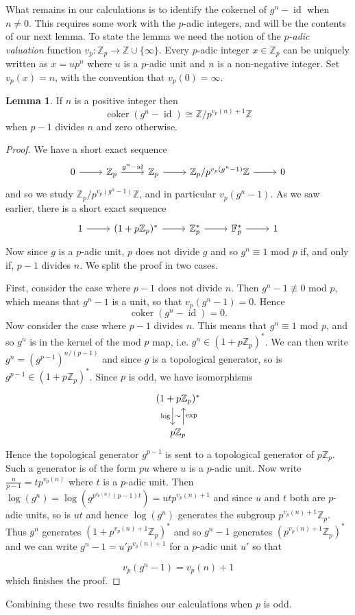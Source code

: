 \documentclass[a4paper]{article} %
\theoremstyle{definition}
\newtheorem{lemma}[theorem]{Lemma}
\newcommand{\Z}{\mathbb{Z}}
\newcommand{\F}{\mathbb{F}}
\DeclareMathOperator{\id}{id}           %
\DeclareMathOperator{\coker}{coker}     %
\begin{document}
What remains in our calculations is to identify the cokernel of $g^n-\id$ when $n \neq 0$. This requires some work with the $p$-adic integers, and will be the contents of our next lemma. To state the lemma we need the notion of the \textit{$p$-adic valuation} function $v_p \colon \Z_p \to \Z \cup \{\infty\}$. Every $p$-adic integer $x \in \Z_p$ can be uniquely written as $x = up^n$ where $u$ is a $p$-adic unit and $n$ is a non-negative integer. Set $v_p(x) = n$, with the convention that $v_p(0) = \infty$.
\begin{lemma}
  If $n$ is a positive integer then
  \[
    \coker(g^n - \id) \cong \Z/p^{v_p(n)+1}\Z
  \]
  when $p-1$ divides $n$ and zero otherwise.
\end{lemma}
\begin{proof}
We have a short exact sequence
\[
\begin{tikzcd}
0 \rar & \Z_p \rar{g^n - \operatorname{id}} & \Z_p \rar{} & \Z_p/{p^{v_p(g^n-1)}\Z} \rar & 0
\end{tikzcd}
\]
and so we study $\Z_p/{p^{v_p(g^n-1)}\Z}$, and in particular $v_p(g^n-1)$. As we saw earlier, there is a short exact sequence
\[
\begin{tikzcd}
1 \rar & (1+p\Z_p)^* \rar{} & \Z_p^* \rar{} & \F_p^* \rar & 1
\end{tikzcd}
\]
Now since $g$ is a $p$-adic unit, $p$ does not divide $g$ and so $g^n \equiv 1$ mod $p$ if, and only if, $p-1$ divides $n$. We split the proof in two cases.

First, consider the case where $p-1$ does not divide $n$. Then $g^n -1 \not\equiv 0$ mod $p$, which means that $g^n -1$ is a unit, so that $v_p(g^n - 1) = 0$. Hence
\[
\coker ( g^n - \id ) = 0.
\]
Now consider the case where $p-1$ divides $n$. This means that $g^n \equiv 1$ mod $p$, and so $g^n$ is in the kernel of the mod $p$ map, i.e. $g^n \in (1 + p\Z_p)^*$. We can then write $g^n = (g^{p-1})^{n/(p-1)}$ and since $g$ is a topological generator, so is $g^{p-1} \in (1 + p\Z_p)^*$. Since $p$ is odd, we have isomorphisms
\[
\begin{tikzcd}
  (1+ p\Z_p)^* \arrow[d, "\log"', "\sim", shift right=1.3ex] \\
  p\Z_p \arrow[u, "\exp"', shift right = 1.3ex]{exp}
\end{tikzcd}
\]
Hence the topological generator $g^{p-1}$ is sent to a topological generator of $p\Z_p$. Such a generator is of the form $pu$ where $u$ is a $p$-adic unit. Now write $\frac{n}{p-1} = tp^{v_p(n)}$  where $t$ is a $p$-adic unit. Then $\log(g^n) = \log(g^{p^{v_p(n)}(p-1)t}) = utp^{v_p(n)+1}$ and since $u$ and $t$ both are $p$-adic units, so is $ut$ and hence $\log(g^n)$ generates the subgroup $p^{v_p(n)+1}\Z_p$.
Thus $g^n$ generates $(1 + p^{v_p(n)+1}\Z_p)^*$ and so  $g^{n}-1$ generates $(p^{v_p(n)+1}\Z_p)^*$ and we can write $g^n-1 =u' p^{v_p(n)+1}$ for a $p$-adic unit $u'$ so that
\iffalse
But if $g^{p-1} \mapsto pu$ then $g^n \mapsto \frac{n}{p-1}pu$ under $\log$, and $$v_p\left(\frac{n}{p-1}pu\right) = v_p(n)+1.$$ We conclude that \fi
\[
v_p(g^n - 1 ) = v_p(n) + 1
\]
which finishes the proof.
\end{proof}
Combining these two results finishes our calculations when $p$ is odd.
\end{document}
